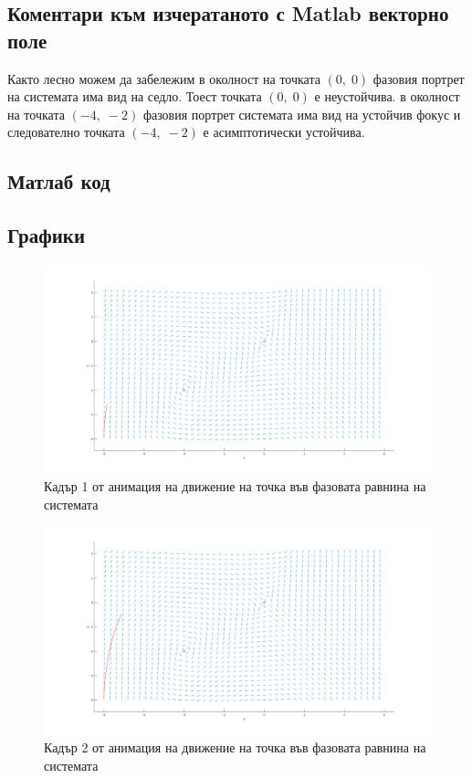 \documentclass[a4paper, 12pt]{article}
\begin{document}
\subsection{Коментари към изчератаното с Matlab векторно поле}

Както лесно можем да забележим в околност на точката $(0, \; 0)$ фазовия
портрет на системата има вид на седло. Тоест точката $(0, \; 0)$ е неустойчива.
в околност на точката $(-4, \; -2)$ фазовия портрет системата има вид на
устойчив фокус и следователно точката $(-4, \; -2)$ е асимптотически устойчива.

\subsection{Матлаб код}



\subsection{Графики}

\begin{figure}[ht]
    \centering
    \includegraphics[width=\textwidth]{move1.png}
    \caption{Кадър 1 от анимация на движение на точка във фазовата равнина на системата}
\end{figure}

\begin{figure}[ht]
    \centering
    \includegraphics[width=\textwidth]{move2.png}
    \caption{Кадър 2 от анимация на движение на точка във фазовата равнина на системата}
\end{figure}
\end{document}
